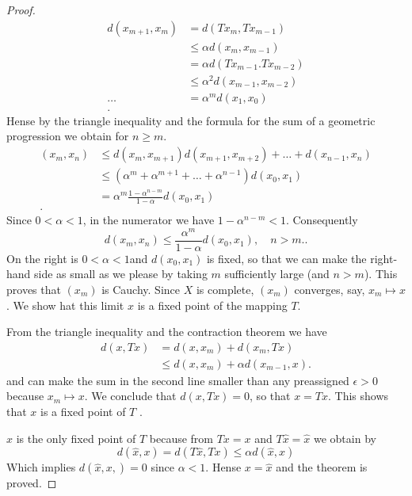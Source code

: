 \documentclass{article}
\theoremstyle{remark}
\begin{document}
\begin{proof}
  \begin{align}
    d\left( x_{m+1}, x_{m} \right) &= d\left( Tx_{m}, Tx_{m-1} \right) \\
    &\le \alpha d\left( x_{m}, x_{m-1} \right)  \\
    &= \alpha d\left( Tx_{m-1}. Tx_{m-2} \right) \\
    &\le \alpha ^{2} d\left( x_{m-1}, x_{m-2} \right) \\
    \ldots&= \alpha ^{m} d\left( x_1, x_0 \right) \\
  .\end{align}
  Hense by the triangle inequality and the formula for the sum of a geometric progression we obtain for $n\ge m$.
  \begin{align*}
    \left( x_{m}, x_{n} \right) &\le d\left( x_{m}, x_{m+1}  \right) d\left( x_{m+1}, x_{m+2} \right) +  \ldots  + d\left( x_{n-1}, x_{n} \right) \\
  &\le \left( \alpha ^{m} + \alpha ^{m+1} + \ldots + \alpha ^{n-1}  \right) d\left( x_0, x_1 \right)  \\
  &= \alpha ^{m} \frac{1- \alpha ^{n-m}}{1- \alpha } d\left( x_0, x_1 \right) \\
  .\end{align*}
  Since $0 < \alpha  <1 $, in the numerator we have $1 - \alpha ^{n-m} < 1 $. Consequently
  \begin{equation}
  \label{eq:fp_3}
  d\left( x_{m}, x_{n} \right) \le \frac{\alpha ^{m}}{1- \alpha } d\left( x_0, x_1 \right), \quad n>m. 
  .\end{equation}
  On the right is $0< \alpha  < 1$and $d\left( x_0,x_1 \right) $ is fixed, so that we can make the right-hand side as small as we please by taking $m$ sufficiently large (and $n>m$). This proves that $\left( x_{m} \right)$ is Cauchy. Since $X$ is complete, $\left( x_{m} \right)$ converges, say, $x_{m} \mapsto x$. We show hat this limit $x$ is a fixed point of the mapping $T$.
  \par
  From the triangle inequality and the contraction theorem  we have
  \begin{align}
    d\left( x,Tx \right) &= d\left( x,x_{m} \right) +  d\left( x_{m}, Tx \right) \\
    &\le d\left( x, x_{m} \right) +  \alpha d\left( x_{m-1}, x \right) 
  .\end{align}
  and can make the sum in the second line smaller than any preassigned $\epsilon > 0$ because $x_{m} \mapsto x$. We conclude that $d\left( x,Tx \right) = 0$, so that $x=Tx$. This shows that $x$ is a fixed point of $T$ . 
  \par
  $x $ is the only fixed point of $T$ because from $Tx= x$ and $T\hat{x} = \hat{x}$ we obtain by \[
    d\left( \hat{x}, x \right) = d\left( T \hat{x}, Tx \right) \le \alpha d\left( \hat{x}, x \right)
  \] 
  Which implies $d\left( \hat{x}, x, \right) = 0$ since $\alpha  < 1 $. Hense $x = \hat{x}$ and the theorem is proved. 
\end{proof}
\end{document}
